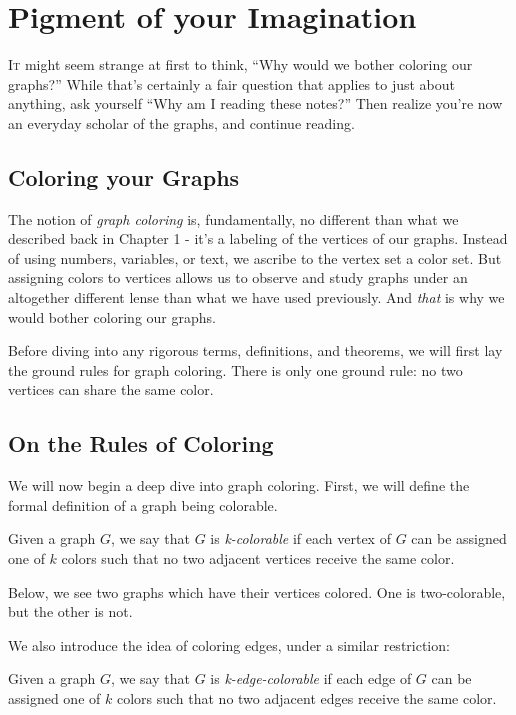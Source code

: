 \chapter{Pigment of your Imagination}
\lettrine[lines=4]{I}{t} might seem strange at first to think, ``Why would we bother coloring our graphs?'' While that's certainly a fair question that applies to just about anything, ask yourself ``Why am I reading these notes?'' Then realize you're now an everyday scholar of the graphs, and continue reading.

\section{Coloring your Graphs}

The notion of \textit{graph coloring} is, fundamentally, no different than what we described back in Chapter 1 - it's a labeling of the vertices of our graphs. Instead of using numbers, variables, or text, we ascribe to the vertex set a color set. But assigning colors to vertices allows us to observe and study graphs under an altogether different lense than what we have used previously. And \textit{that} is why we would bother coloring our graphs.

Before diving into any rigorous terms, definitions, and theorems, we will first lay the ground rules for graph coloring. There is only one ground rule: no two vertices can share the same color.

\section{On the Rules of Coloring}
We will now begin a deep dive into graph coloring. First, we will define the formal definition of a graph being colorable.

\begin{definition}[K-Colorable]
    Given a graph $G$, we say that $G$ is \textit{k-colorable} if each vertex of $G$ can be assigned one of $k$ colors such that no two adjacent vertices receive the same color.
\end{definition}

Below, we see two graphs which have their vertices colored. One is two-colorable, but the other is not.


We also introduce the idea of coloring edges, under a similar restriction:

\begin{definition}
    Given a graph $G$, we say that $G$ is \textit{k-edge-colorable} if each edge of $G$ can be assigned one of $k$ colors such that no two adjacent edges receive the same color.
\end{definition}

